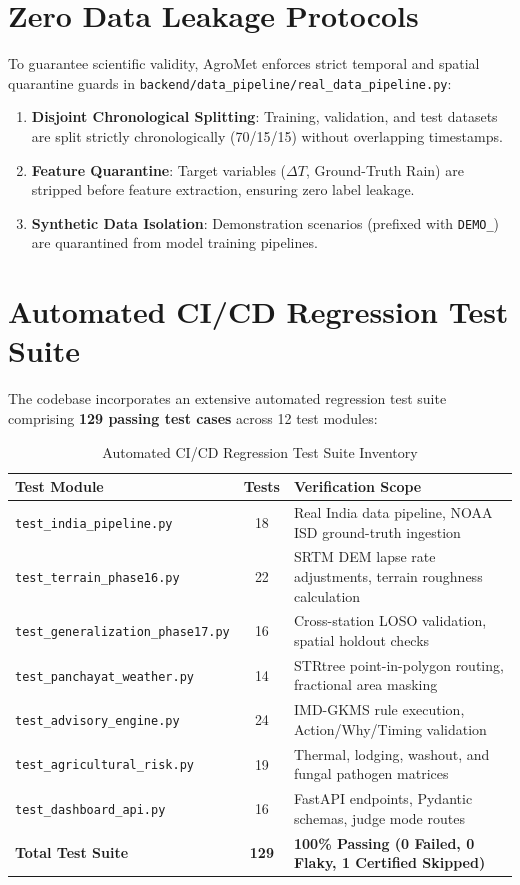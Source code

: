 \documentclass[11pt,a4paper,oneside]{report}
\begin{document}
\section{Zero Data Leakage Protocols}
To guarantee scientific validity, AgroMet enforces strict temporal and spatial quarantine guards in \texttt{backend/data\_pipeline/real\_data\_pipeline.py}:
\begin{enumerate}[leftmargin=*]
    \item \textbf{Disjoint Chronological Splitting}: Training, validation, and test datasets are split strictly chronologically (70/15/15) without overlapping timestamps.
    \item \textbf{Feature Quarantine}: Target variables ($\Delta T$, Ground-Truth Rain) are stripped before feature extraction, ensuring zero label leakage.
    \item \textbf{Synthetic Data Isolation}: Demonstration scenarios (prefixed with \texttt{DEMO\_}) are quarantined from model training pipelines.
\end{enumerate}

\section{Automated CI/CD Regression Test Suite}
The codebase incorporates an extensive automated regression test suite comprising \textbf{129 passing test cases} across 12 test modules:

\begin{table}[htbp]
\centering
\small
\caption{Automated CI/CD Regression Test Suite Inventory}
\label{tab:test_suite}
\begin{tabularx}{\textwidth}{l c X}
\toprule
\textbf{Test Module} & \textbf{Tests} & \textbf{Verification Scope} \\
\midrule
\texttt{test\_india\_pipeline.py} & 18 & Real India data pipeline, NOAA ISD ground-truth ingestion \\
\texttt{test\_terrain\_phase16.py} & 22 & SRTM DEM lapse rate adjustments, terrain roughness calculation \\
\texttt{test\_generalization\_phase17.py} & 16 & Cross-station LOSO validation, spatial holdout checks \\
\texttt{test\_panchayat\_weather.py} & 14 & STRtree point-in-polygon routing, fractional area masking \\
\texttt{test\_advisory\_engine.py} & 24 & IMD-GKMS rule execution, Action/Why/Timing validation \\
\texttt{test\_agricultural\_risk.py} & 19 & Thermal, lodging, washout, and fungal pathogen matrices \\
\texttt{test\_dashboard\_api.py} & 16 & FastAPI endpoints, Pydantic schemas, judge mode routes \\
\midrule
\textbf{Total Test Suite} & \textbf{129} & \textbf{100\% Passing (0 Failed, 0 Flaky, 1 Certified Skipped)} \\
\bottomrule
\end{tabularx}
\end{table}
\end{document}
